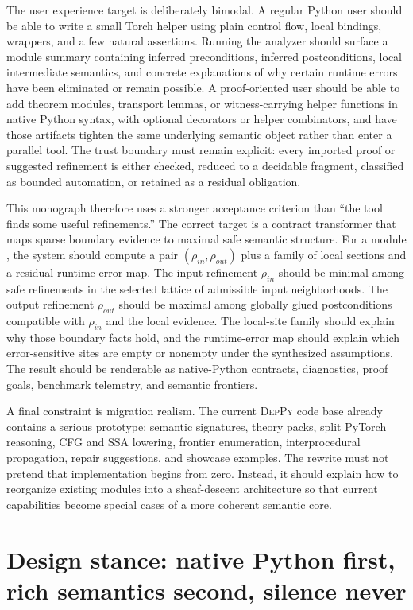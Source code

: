 \documentclass[11pt]{report}
\newcommand{\DepPy}{\textsc{DepPy}}
\DeclareRobustCommand{\py}[1]{\texttt{\detokenize{#1}}}
\theoremstyle{definition}
\theoremstyle{plain}
\begin{document}
The user experience target is deliberately bimodal. A regular Python user should
be able to write a small Torch helper using plain control flow, local bindings,
wrappers, and a few natural assertions. Running the analyzer should surface a
module summary containing inferred preconditions, inferred postconditions, local
intermediate semantics, and concrete explanations of why certain runtime errors
have been eliminated or remain possible. A proof-oriented user should be able to
add theorem modules, transport lemmas, or witness-carrying helper functions in
native Python syntax, with optional decorators or helper combinators, and have
those artifacts tighten the same underlying semantic object rather than enter a
parallel tool. The trust boundary must remain explicit: every imported proof or
suggested refinement is either checked, reduced to a decidable fragment,
classified as bounded automation, or retained as a residual obligation.

This monograph therefore uses a stronger acceptance criterion than ``the tool
finds some useful refinements.'' The correct target is a contract transformer
that maps sparse boundary evidence to maximal safe semantic structure. For a
module \py{f}, the system should compute a pair $(\rho_{in}, \rho_{out})$ plus a
family of local sections and a residual runtime-error map. The input refinement
$\rho_{in}$ should be minimal among safe refinements in the selected lattice of
admissible input neighborhoods. The output refinement $\rho_{out}$ should be
maximal among globally glued postconditions compatible with $\rho_{in}$ and the
local evidence. The local-site family should explain why those boundary facts
hold, and the runtime-error map should explain which error-sensitive sites are
empty or nonempty under the synthesized assumptions. The result should be
renderable as native-Python contracts, diagnostics, proof goals, benchmark
telemetry, and semantic frontiers.

A final constraint is migration realism. The current \DepPy{} code base already
contains a serious prototype: semantic signatures, theory packs, split PyTorch
reasoning, CFG and SSA lowering, frontier enumeration, interprocedural
propagation, repair suggestions, and showcase examples. The rewrite must not
pretend that implementation begins from zero. Instead, it should explain how to
reorganize existing modules into a sheaf-descent architecture so that current
capabilities become special cases of a more coherent semantic core.


\section{Design stance: native Python first, rich semantics second, silence never}
\end{document}

